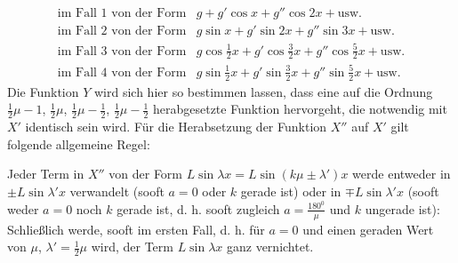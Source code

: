 \[
\begin{array}{ll}
\text{im Fall 1 von der Form}&g+g'\cos x+g''\cos 2x+\text{usw.}\\
\text{im Fall 2 von der Form}&g\sin x+g'\sin 2x+g''\sin 3x+\text{usw.}\\
\text{im Fall 3 von der Form}&g\cos\frac12x+g'\cos\frac32x+g''\cos\frac52x+\text{usw.}\\
\text{im Fall 4 von der Form}&g\sin\frac12x+g'\sin\frac32x+g''\sin\frac52x+\text{usw.}
\end{array}
\]
Die Funktion $Y$ wird sich hier so bestimmen lassen, dass eine auf die Ordnung $\frac12\mu-1$, $\frac12\mu$, $\frac12\mu-\frac12$, $\frac12\mu-\frac12$ herabgesetzte Funktion hervorgeht, die notwendig mit $X'$ identisch sein wird. Für die Herabsetzung der Funktion $X''$ auf $X'$ gilt folgende allgemeine Regel:

Jeder Term in $X''$ von der Form $L\sin\lambda x=L\sin(k\mu\pm\lambda')x$ werde entweder in $\pm L\sin\lambda'x$ verwandelt (sooft $a=0$ oder $k$ gerade ist) oder in $\mp L\sin\lambda'x$ (sooft weder $a=0$ noch $k$ gerade ist, d. h. sooft zugleich $a=\frac{180^0}{\mu}$ und $k$ ungerade ist): Schließlich werde, sooft im
ersten Fall, d. h. für \(a=0\) und einen geraden Wert von \(\mu\), \(\lambda'=\frac12\mu\) wird, der Term \(L\sin\lambda x\) ganz vernichtet.

\endgroup
